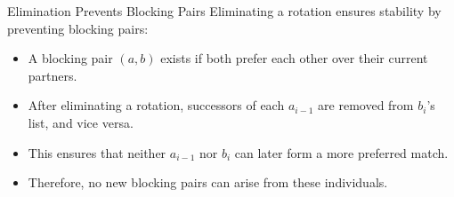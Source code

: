 \documentclass[aspectratio=169,xcolor=dvipsnames]{beamer}
\begin{document}
\begin{frame}{Elimination Prevents Blocking Pairs}
  Eliminating a rotation ensures stability by preventing blocking pairs:
  \begin{itemize}
    \item A blocking pair \((a, b)\) exists if both prefer each other over their current partners.
    \item After eliminating a rotation, successors of each \( a_{i-1} \) are removed from \( b_i \)'s list, and vice versa.
    \item This ensures that neither \( a_{i-1} \) nor \( b_i \) can later form a more preferred match.
    \item Therefore, no new blocking pairs can arise from these individuals.
  \end{itemize}
\end{frame}


\end{document}
